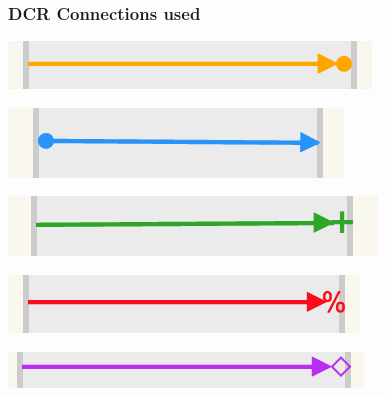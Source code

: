 \documentclass{beamer}
\begin{document}
    \begin{frame}[t]
        \frametitle{DCR Connections used}
        \begin{minipage}[c]{0.5\textwidth}
        \begin{description}[Milestone]
            \item[Condition] \includegraphics[width=0.8\linewidth]{images/condition.png} \\
            \item[Response] \includegraphics[width=0.8\linewidth]{images/response.png} 
            \item[Include] \includegraphics[width=0.8\linewidth]{images/include.png} 
            \item[Exclude] \includegraphics[width=0.8\linewidth]{images/exclude.png} 
            \item[Milestone] \includegraphics[width=0.8\linewidth]{images/milestone.png} 
        \end{description}
        \end{minipage}%
        \begin{minipage}[c]{0.5\textwidth}

\end{minipage}
\end{frame}
\end{document}
